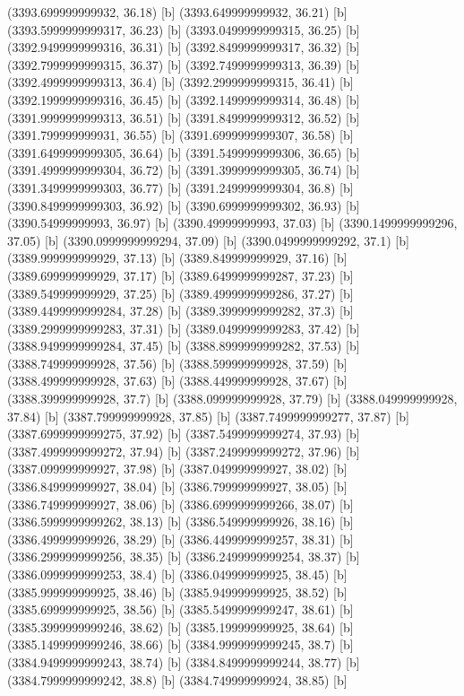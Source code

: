 {{{(3393.699999999932, 36.18) [b] 
(3393.649999999932, 36.21) [b] 
(3393.5999999999317, 36.23) [b] 
(3393.0499999999315, 36.25) [b] 
(3392.9499999999316, 36.31) [b] 
(3392.8499999999317, 36.32) [b] 
(3392.7999999999315, 36.37) [b] 
(3392.7499999999313, 36.39) [b] 
(3392.4999999999313, 36.4) [b] 
(3392.2999999999315, 36.41) [b] 
(3392.1999999999316, 36.45) [b] 
(3392.1499999999314, 36.48) [b] 
(3391.9999999999313, 36.51) [b] 
(3391.8499999999312, 36.52) [b] 
(3391.799999999931, 36.55) [b] 
(3391.6999999999307, 36.58) [b] 
(3391.6499999999305, 36.64) [b] 
(3391.5499999999306, 36.65) [b] 
(3391.4999999999304, 36.72) [b] 
(3391.3999999999305, 36.74) [b] 
(3391.3499999999303, 36.77) [b] 
(3391.2499999999304, 36.8) [b] 
(3390.8499999999303, 36.92) [b] 
(3390.6999999999302, 36.93) [b] 
(3390.54999999993, 36.97) [b] 
(3390.49999999993, 37.03) [b] 
(3390.1499999999296, 37.05) [b] 
(3390.0999999999294, 37.09) [b] 
(3390.0499999999292, 37.1) [b] 
(3389.999999999929, 37.13) [b] 
(3389.849999999929, 37.16) [b] 
(3389.699999999929, 37.17) [b] 
(3389.6499999999287, 37.23) [b] 
(3389.549999999929, 37.25) [b] 
(3389.4999999999286, 37.27) [b] 
(3389.4499999999284, 37.28) [b] 
(3389.3999999999282, 37.3) [b] 
(3389.2999999999283, 37.31) [b] 
(3389.0499999999283, 37.42) [b] 
(3388.9499999999284, 37.45) [b] 
(3388.8999999999282, 37.53) [b] 
(3388.749999999928, 37.56) [b] 
(3388.599999999928, 37.59) [b] 
(3388.499999999928, 37.63) [b] 
(3388.449999999928, 37.67) [b] 
(3388.399999999928, 37.7) [b] 
(3388.099999999928, 37.79) [b] 
(3388.049999999928, 37.84) [b] 
(3387.799999999928, 37.85) [b] 
(3387.7499999999277, 37.87) [b] 
(3387.6999999999275, 37.92) [b] 
(3387.5499999999274, 37.93) [b] 
(3387.4999999999272, 37.94) [b] 
(3387.2499999999272, 37.96) [b] 
(3387.099999999927, 37.98) [b] 
(3387.049999999927, 38.02) [b] 
(3386.849999999927, 38.04) [b] 
(3386.799999999927, 38.05) [b] 
(3386.749999999927, 38.06) [b] 
(3386.6999999999266, 38.07) [b] 
(3386.5999999999262, 38.13) [b] 
(3386.549999999926, 38.16) [b] 
(3386.499999999926, 38.29) [b] 
(3386.4499999999257, 38.31) [b] 
(3386.2999999999256, 38.35) [b] 
(3386.2499999999254, 38.37) [b] 
(3386.0999999999253, 38.4) [b] 
(3386.049999999925, 38.45) [b] 
(3385.999999999925, 38.46) [b] 
(3385.949999999925, 38.52) [b] 
(3385.699999999925, 38.56) [b] 
(3385.5499999999247, 38.61) [b] 
(3385.3999999999246, 38.62) [b] 
(3385.199999999925, 38.64) [b] 
(3385.1499999999246, 38.66) [b] 
(3384.9999999999245, 38.7) [b] 
(3384.9499999999243, 38.74) [b] 
(3384.8499999999244, 38.77) [b] 
(3384.7999999999242, 38.8) [b] 
(3384.749999999924, 38.85) [b] 
}}}
